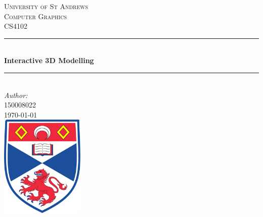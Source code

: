 \documentclass[12pt]{article}
\begin{document}
\begin{titlepage}

\newcommand{\HRule}{\rule{\linewidth}{0.5mm}} %

\center %
 

\textsc{\LARGE University of St Andrews}\\[1.5cm] %
\textsc{\Large Computer Graphics}\\[0.5cm] %
\textsc{\large CS4102}\\[0.5cm] %


\HRule \\[0.4cm]
{ \huge \bfseries Interactive 3D Modelling}\\[0.4cm] %
\HRule \\[1.5cm]
 


\Large \emph{Author:}\\
 \textsc{150008022}\\[1cm] %
 

{\large \today}\\[2cm] %


\includegraphics[width = 4cm]{images/standrewslogo.png}
 

\end{titlepage}
\end{document}
